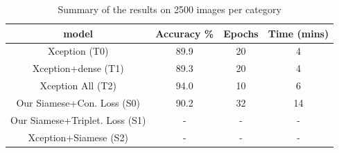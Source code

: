 \begin{table}[ht]
    \caption{Summary of the results on 2500 images per category} 
    \centering 
    \begin{tabular}{c c c c} 
    \hline\hline 
    
    model & Accuracy \% & Epochs & Time (mins)  \\%
    \hline %
    Xception (T0) & 89.9 & 20 & 4 \\%
    Xception+dense (T1) & 89.3 & 20 & 4 \\%
    Xception All (T2) & 94.0 & 10 & 6 \\%
    Our Siamese+Con. Loss (S0) & 90.2 & 32 & 14 \\%
    Our Siamese+Triplet. Loss (S1) & - & - & - \\%
    Xception+Siamese (S2) & - & - & - \\%
    \hline 
    \end{tabular}
\label{table:data} %
\end{table}







